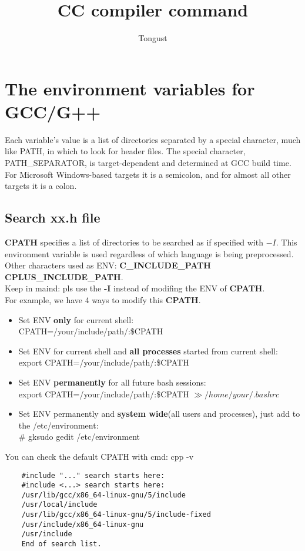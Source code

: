 \documentclass[a4paper, 12pt]{article}
\title{CC compiler command}
\author{Tongust}
\begin{document}
    \maketitle
    \tableofcontents
    \section{The environment variables for GCC/G++}
    Each variable’s value is a list of directories separated by a special character, much like PATH, in which to look for header files. The special character, PATH\_SEPARATOR, is target-dependent and determined at GCC build time. For Microsoft Windows-based targets it is a semicolon, and for almost all other targets it is a colon.
    \subsection{Search xx.h file}
    \textbf{CPATH} specifies a list of directories to be searched as if specified with $-I$. This environment variable is used regardless of which language is being preprocessed. Other characters used as ENV: \textbf{C\_INCLUDE\_PATH CPLUS\_INCLUDE\_PATH}.\\
    Keep in maind: pls use the \textbf{-I} instead of modifing the ENV of \textbf{CPATH}.\\
    For example, we have 4 ways to modify this \textbf{CPATH}.\\
    \begin{itemize}
        \item Set ENV \textbf{only} for current shell:\\
            \textsf{CPATH=/your/include/path/:\$CPATH}\\
        \item Set ENV for current shell and \textbf{all processes} started from current shell:\\
            \textsf{export CPATH=/your/include/path/:\$CPATH}
        \item Set ENV \textbf{permanently} for all future bash sessions:\\
            \textsf{export CPATH=/your/include/path/:\$CPATH $\gg /home/your/.bashrc$}
        \item Set ENV permanently and \textbf{system wide}(all users and processes), just add to the /etc/environment:\\
            \textsf{\# gksudo gedit /etc/environment}
    \end{itemize}
    You can check the default CPATH with cmd: cpp -v \\
    \begin{verbatim}
    #include "..." search starts here:
    #include <...> search starts here:
    /usr/lib/gcc/x86_64-linux-gnu/5/include
    /usr/local/include
    /usr/lib/gcc/x86_64-linux-gnu/5/include-fixed
    /usr/include/x86_64-linux-gnu
    /usr/include
    End of search list.
    \end{verbatim}
\end{document}
